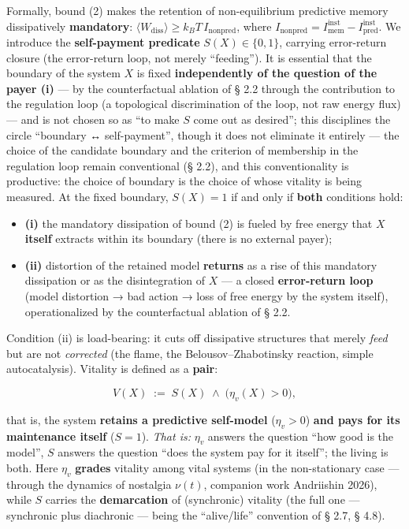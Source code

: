 \documentclass[pdflatex,sn-mathphys-ay]{sn-jnl}
\providecommand{\tightlist}{\setlength{\itemsep}{0pt}\setlength{\parskip}{0pt}}
\begin{document}
Formally, bound (2) makes the retention of non-equilibrium predictive memory dissipatively \textbf{mandatory}: \(\langle W_{\text{diss}} \rangle \ge k_B T\,I_{\text{nonpred}}\), where \(I_{\text{nonpred}} = I_{\text{mem}}^{\text{inst}} - I_{\text{pred}}^{\text{inst}}\). We introduce the \textbf{self-payment predicate} \(S(X) \in \{0, 1\}\), carrying error-return closure (the error-return loop, not merely ``feeding''). It is essential that the boundary of the system \(X\) is fixed \textbf{independently of the question of the payer (i)} --- by the counterfactual ablation of § 2.2 through the contribution to the regulation loop (a topological discrimination of the loop, not raw energy flux) --- and is not chosen so as ``to make \(S\) come out as desired''; this disciplines the circle ``boundary ↔ self-payment'', though it does not eliminate it entirely --- the choice of the candidate boundary and the criterion of membership in the regulation loop remain conventional (§ 2.2), and this conventionality is productive: the choice of boundary is the choice of whose vitality is being measured. At the fixed boundary, \(S(X) = 1\) if and only if \textbf{both} conditions hold:

\begin{itemize}
\tightlist
\item
  \textbf{(i)} the mandatory dissipation of bound (2) is fueled by free energy that \(X\) \textbf{itself} extracts within its boundary (there is no external payer);
\item
  \textbf{(ii)} distortion of the retained model \textbf{returns} as a rise of this mandatory dissipation or as the disintegration of \(X\) --- a closed \textbf{error-return loop} (model distortion → bad action → loss of free energy by the system itself), operationalized by the counterfactual ablation of § 2.2.
\end{itemize}

Condition (ii) is load-bearing: it cuts off dissipative structures that merely \emph{feed} but are not \emph{corrected} (the flame, the Belousov--Zhabotinsky reaction, simple autocatalysis). Vitality is defined as a \textbf{pair}:

\[V(X) \;:=\; S(X) \;\wedge\; \big(\eta_v(X) > 0\big),\]

that is, the system \textbf{retains a predictive self-model} (\(\eta_v > 0\)) \textbf{and pays for its maintenance itself} (\(S = 1\)). \emph{That is:} \(\eta_v\) answers the question ``how good is the model'', \(S\) answers the question ``does the system pay for it itself''; the living is both. Here \(\eta_v\) \textbf{grades} vitality among vital systems (in the non-stationary case --- through the dynamics of nostalgia \(\nu(t)\), companion work Andriishin 2026), while \(S\) carries the \textbf{demarcation} of (synchronic) vitality (the full one --- synchronic plus diachronic --- being the ``alive/life'' convention of § 2.7, § 4.8).
\end{document}
